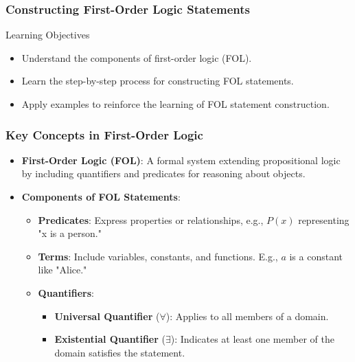 \documentclass[aspectratio=169]{beamer}
\begin{document}
\begin{frame}[fragile]
    \frametitle{Constructing First-Order Logic Statements}
    \begin{block}{Learning Objectives}
        \begin{itemize}
            \item Understand the components of first-order logic (FOL).
            \item Learn the step-by-step process for constructing FOL statements.
            \item Apply examples to reinforce the learning of FOL statement construction.
        \end{itemize}
    \end{block}
\end{frame}

\begin{frame}[fragile]
    \frametitle{Key Concepts in First-Order Logic}
    \begin{itemize}
        \item \textbf{First-Order Logic (FOL)}: A formal system extending propositional logic by including quantifiers and predicates for reasoning about objects.
        \item \textbf{Components of FOL Statements}:
        \begin{itemize}
            \item \textbf{Predicates}: Express properties or relationships, e.g., \( P(x) \) representing "x is a person."
            \item \textbf{Terms}: Include variables, constants, and functions. E.g., \( a \) is a constant like "Alice."
            \item \textbf{Quantifiers}:
            \begin{itemize}
                \item \textbf{Universal Quantifier} (\( \forall \)): Applies to all members of a domain.
                \item \textbf{Existential Quantifier} (\( \exists \)): Indicates at least one member of the domain satisfies the statement.
            \end{itemize}
        \end{itemize}
    \end{itemize}
\end{frame}
\end{document}
